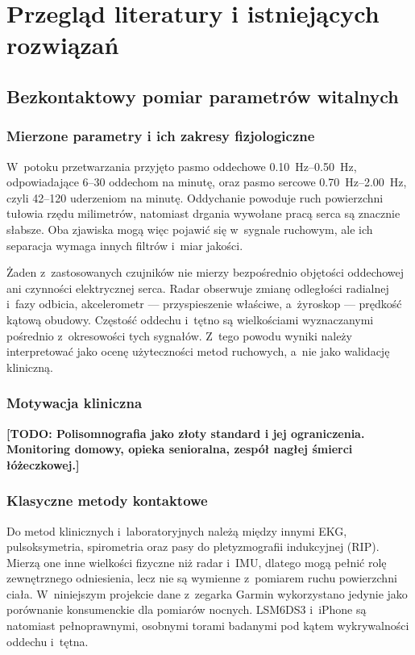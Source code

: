 \documentclass[12pt,a4paper,oneside]{report}
\newcommand{\todo}[1]{\textcolor{red!75!black}{\textbf{[TODO: #1]}}}
\newcommand{\miejsce}[1]{\todo{#1}}
\begin{document}
\part{Przegląd literatury i istniejących rozwiązań}
\label{part:sota}

\chapter{Bezkontaktowy pomiar parametrów witalnych}

\section{Mierzone parametry i ich zakresy fizjologiczne}
W~potoku przetwarzania przyjęto pasmo oddechowe
\SIrange{0.10}{0.50}{Hz}, odpowiadające 6--30 oddechom na minutę, oraz pasmo
sercowe \SIrange{0.70}{2.00}{Hz}, czyli 42--120 uderzeniom na minutę.
Oddychanie powoduje ruch powierzchni tułowia rzędu milimetrów, natomiast
drgania wywołane pracą serca są znacznie słabsze. Oba zjawiska mogą więc
pojawić się w~sygnale ruchowym, ale ich separacja wymaga innych filtrów i~miar
jakości.

Żaden z~zastosowanych czujników nie mierzy bezpośrednio objętości oddechowej
ani czynności elektrycznej serca. Radar obserwuje zmianę odległości radialnej
i~fazy odbicia, akcelerometr --- przyspieszenie właściwe, a~żyroskop ---
prędkość kątową obudowy. Częstość oddechu i~tętno są wielkościami wyznaczanymi
pośrednio z~okresowości tych sygnałów. Z~tego powodu wyniki należy interpretować
jako ocenę użyteczności metod ruchowych, a~nie jako walidację kliniczną.

\section{Motywacja kliniczna}
\miejsce{Polisomnografia jako złoty standard i jej ograniczenia. Monitoring
domowy, opieka senioralna, zespół nagłej śmierci łóżeczkowej.}

\section{Klasyczne metody kontaktowe}
Do metod klinicznych i~laboratoryjnych należą między innymi EKG,
pulsoksymetria, spirometria oraz pasy do pletyzmografii indukcyjnej (RIP).
Mierzą one inne wielkości fizyczne niż radar i~IMU, dlatego mogą pełnić rolę
zewnętrznego odniesienia, lecz nie są wymienne z~pomiarem ruchu powierzchni
ciała. W~niniejszym projekcie dane z~zegarka Garmin wykorzystano jedynie jako
porównanie konsumenckie dla pomiarów nocnych. LSM6DS3 i~iPhone są natomiast
pełnoprawnymi, osobnymi torami badanymi pod kątem wykrywalności oddechu i~tętna.
\end{document}
